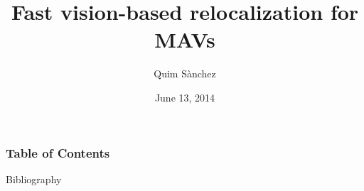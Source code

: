 \documentclass{beamer}
\title{Fast vision-based relocalization for MAVs}
\author {Quim S\`{a}nchez}
\date{June 13, 2014}
\institute[UZ, UdG]{
University of Zurich, Universitat de Girona\\
}
\begin{document}
\frame{\titlepage}

\begin{frame}
  \frametitle{Table of Contents}
  \tableofcontents
\end{frame}








\begin{frame}[t]{Bibliography}
  
  
\end{frame}
\end{document}
